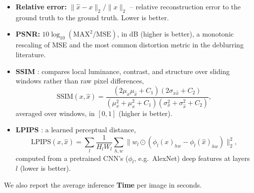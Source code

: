 \documentclass[12pt, a4paper, onecolumn]{article}
\theoremstyle{plain}          %
\theoremstyle{definition}     %
\theoremstyle{remark}
\begin{document}
\begin{itemize}
    \item \textbf{Relative error:} $\|\hat x-x\|_2/\|x\|_2$ -- relative reconstruction error to the ground truth to the ground truth. Lower is better.
    \item \textbf{PSNR:} $10\log_{10}(\text{MAX}^2/\text{MSE})$, in dB (higher is better), a monotonic rescaling of MSE and the most common distortion metric in the deblurring literature.
    \item \textbf{SSIM} \cite{ssim2004}: compares local luminance, contrast, and structure over sliding windows rather than raw pixel differences,
    \begin{equation}
        \text{SSIM}(x,\hat x) = \frac{(2\mu_x\mu_{\hat x}+C_1)(2\sigma_{x\hat x}+C_2)}
        {(\mu_x^2+\mu_{\hat x}^2+C_1)(\sigma_x^2+\sigma_{\hat x}^2+C_2)},
        \label{eq:ssim}
    \end{equation}
    averaged over windows, in $[0,1]$ (higher is better).
    \item \textbf{LPIPS} \cite{lpips2018}: a learned perceptual distance,
    \begin{equation}
        \text{LPIPS}(x,\hat x) = \sum_l \frac{1}{H_lW_l}\sum_{h,w}
        \big\|w_l\odot(\phi_l(x)_{hw}-\phi_l(\hat x)_{hw})\big\|_2^2,
        \label{eq:lpips}
    \end{equation}
    computed from a pretrained CNN's ($\phi_l$, e.g.\ AlexNet) deep features at layers $l$ (lower is better).
\end{itemize}
We also report the average inference \textbf{Time} per image in seconds.
\end{document}
